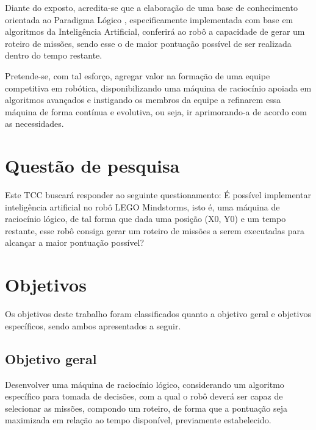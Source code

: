 Diante do exposto, acredita-se que a elaboração de uma base de conhecimento orientada ao Paradigma Lógico \cite{tucker2009linguagens}, especificamente implementada com base em algoritmos da Inteligência Artificial, conferirá ao robô a capacidade de gerar um roteiro de missões, sendo esse o de maior pontuação possível de ser realizada dentro do tempo restante.

Pretende-se, com tal esforço, agregar valor na formação de uma equipe competitiva em robótica, disponibilizando uma máquina de raciocínio apoiada em algoritmos avançados e instigando os membros da equipe a refinarem essa máquina de forma contínua e evolutiva, ou seja, ir aprimorando-a de acordo com as necessidades.

\section{Questão de pesquisa}

Este TCC buscará responder ao seguinte questionamento: É possível implementar inteligência artificial no robô LEGO Mindstorms, isto é, uma máquina de raciocínio lógico, de tal forma que dada uma posição (X0, Y0) e um tempo restante, esse robô consiga gerar um roteiro de missões a serem executadas para alcançar a maior pontuação possível?

\section{Objetivos}
Os objetivos deste trabalho foram classificados quanto a objetivo geral e objetivos específicos, sendo ambos apresentados a seguir.

\subsection{Objetivo geral}
Desenvolver uma máquina de raciocínio lógico, considerando um algoritmo específico para tomada de decisões, com a qual o robô deverá ser capaz de selecionar as missões, compondo um roteiro, de forma que a pontuação seja maximizada em relação ao tempo disponível, previamente estabelecido.

